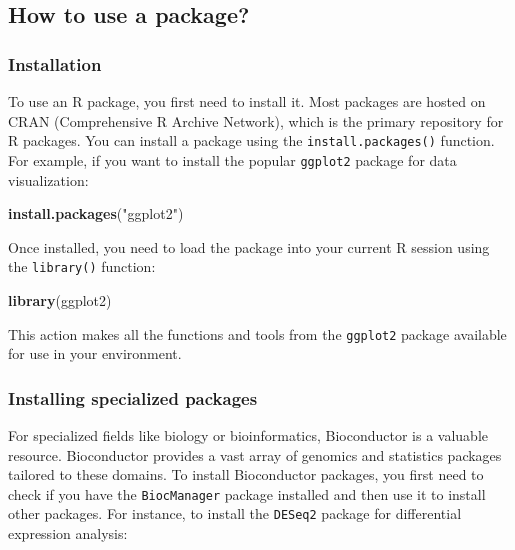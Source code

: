 \documentclass[
]{book}
\newenvironment{Shaded}{\begin{snugshade}}{\end{snugshade}}
\newcommand{\FunctionTok}[1]{\textcolor[rgb]{0.13,0.29,0.53}{\textbf{#1}}}
\newcommand{\NormalTok}[1]{#1}
\newcommand{\StringTok}[1]{\textcolor[rgb]{0.31,0.60,0.02}{#1}}
\begin{document}
\hypertarget{how-to-use-a-package}{%
\subsection{How to use a package?}\label{how-to-use-a-package}}

\hypertarget{installation}{%
\subsubsection{Installation}\label{installation}}

To use an R package, you first need to install it. Most packages are hosted on CRAN (Comprehensive R Archive Network), which is the primary repository for R packages. You can install a package using the \texttt{install.packages()} function. For example, if you want to install the popular \texttt{ggplot2} package for data visualization:

\begin{Shaded}
\begin{Highlighting}[]
\FunctionTok{install.packages}\NormalTok{(}\StringTok{"ggplot2"}\NormalTok{)}
\end{Highlighting}
\end{Shaded}

Once installed, you need to load the package into your current R session using the \texttt{library()} function:

\begin{Shaded}
\begin{Highlighting}[]
\FunctionTok{library}\NormalTok{(ggplot2)}
\end{Highlighting}
\end{Shaded}

This action makes all the functions and tools from the \texttt{ggplot2} package available for use in your environment.

\hypertarget{installing-specialized-packages}{%
\subsubsection{Installing specialized packages}\label{installing-specialized-packages}}

For specialized fields like biology or bioinformatics, Bioconductor is a valuable resource. Bioconductor provides a vast array of genomics and statistics packages tailored to these domains. To install Bioconductor packages, you first need to check if you have the \texttt{BiocManager} package installed and then use it to install other packages. For instance, to install the \texttt{DESeq2} package for differential expression analysis:
\end{document}
